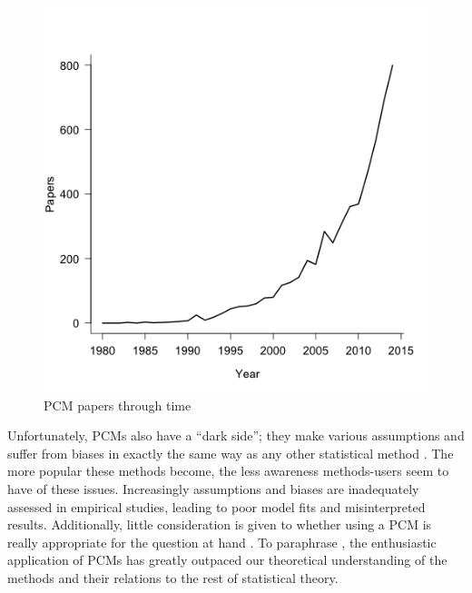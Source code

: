 \documentclass[a4paper,12pt]{article}
\begin{document}
  \begin{figure}[h]
    \centering
    \includegraphics[width=12cm]{Figures/PCMCitations.png}
    \caption{PCM papers through time}
    \label{PCMCitations}
  \end{figure}

Unfortunately, PCMs also have a ``dark side''; they make various assumptions and suffer from biases in exactly the same way as any other statistical method \citep{freckleton2009seven,boettiger2012your}.
The more popular these methods become, the less awareness methods-users seem to have of these issues. Increasingly assumptions and biases are inadequately assessed in empirical studies, leading to poor model fits and misinterpreted results. 
Additionally, little consideration is given to whether using a PCM is really appropriate for the question at hand \citep{losos2011seeing}. 
To paraphrase \citet{blomberg2012independent}, the enthusiastic application of PCMs has greatly outpaced our theoretical understanding of the methods and their relations to the rest of statistical theory.\\

\end{document}
